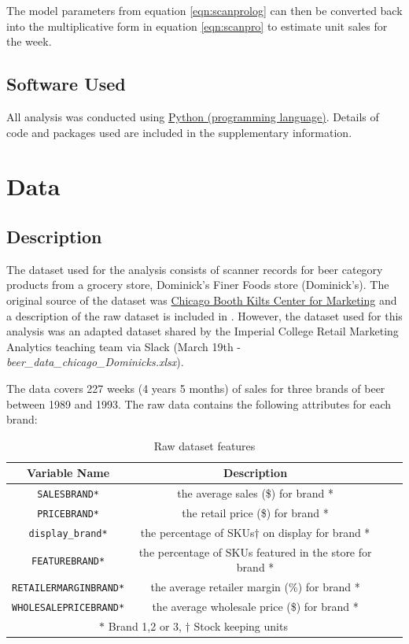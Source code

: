 \documentclass[a4paper,11pt]{article}
\begin{document}
The model parameters from equation \ref{eqn:scanprolog} can then be converted back into the multiplicative form in equation \ref{eqn:scanpro} to estimate unit sales for the week.


\subsection{Software Used}

All analysis was conducted using \href{https://www.python.org/}{Python (programming language)}. Details of code and packages used are included in the supplementary information.


\section{Data}
\subsection{Description}
The dataset used for the analysis consists of scanner records for beer category products from a grocery store, Dominick's Finer Foods store (Dominick's). The original source of the dataset was  \href{https://www.chicagobooth.edu/research/kilts/datasets/dominicks}{Chicago Booth Kilts Center for Marketing} and a description of the raw dataset is included in \citet{srinivasan_promotions_2004}. However, the dataset used for this analysis was an adapted dataset shared by the Imperial College Retail Marketing Analytics teaching team via Slack (March 19th - \emph{beer\_data\_chicago\_Dominicks.xlsx}).

The data covers 227 weeks (4 years 5 months) of sales for three brands of beer between 1989 and 1993. The raw data contains the following attributes for each brand:

\begin{table}[htb]
 \centering
 \caption{Raw dataset features}\label{tab:data_features}
 \begin{tabular}{cccc}
 \toprule
  Variable Name & Description \\
  \midrule
  \texttt{SALESBRAND*}& the average sales (\$) for brand * \\
  \texttt{PRICEBRAND*}	& the retail price (\$) for brand * \\
  \texttt{display\_brand*}	& the percentage of SKUs{$\dagger$} on display for brand * \\
  \texttt{FEATUREBRAND*}	& the percentage of SKUs featured in the store for brand * \\
  \texttt{RETAILERMARGINBRAND*} & the average retailer margin (\%) for brand * \\
  \texttt{WHOLESALEPRICEBRAND*} & the average wholesale price (\$) for brand * \\
  \bottomrule
  \multicolumn{2}{c}{$*$ Brand 1,2 or 3, $\dagger$ Stock keeping units}
 \end{tabular}
\end{table}
\end{document}
